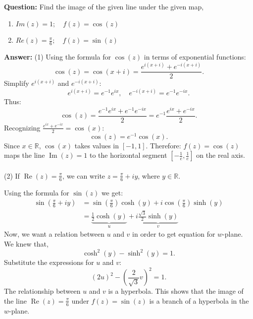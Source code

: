 \begin{example}
\textbf{Question:} Find the image of the given line under the given map, 
    \begin{enumerate}
        \item $Im(z)=1;\quad f(z)=\cos(z)$
        \item $Re(z)=\frac{\pi}{6};\quad f(z)=\sin(z)$
    \end{enumerate}
\textbf{Answer:} (1) Using the formula for \( \cos(z) \) in terms of exponential functions:
\[
\cos(z) = \cos(x + i) = \frac{e^{i(x+i)} + e^{-i(x+i)}}{2}.
\]
Simplify \( e^{i(x+i)} \) and \( e^{-i(x+i)} \):
\[
e^{i(x+i)} = e^{-1} e^{ix}, \quad e^{-i(x+i)} = e^{-1} e^{-ix}.
\]
Thus:
\[
\cos(z) = \frac{e^{-1} e^{ix} + e^{-1} e^{-ix}}{2} = e^{-1} \frac{e^{ix} + e^{-ix}}{2}.
\]
Recognizing \( \frac{e^{ix} + e^{-ix}}{2} = \cos(x) \):
\[
\cos(z) = e^{-1} \cos(x).
\]
Since \( x \in \mathbb{R} \), \( \cos(x) \) takes values in \([-1, 1]\). Therefore: $f(z) = \cos(z)$ maps the line $\operatorname{Im}(z) = 1$ to the horizontal segment $\left[-\frac{1}{e}, \frac{1}{e}\right]$ on the real axis.\\~\\
(2) If \( \operatorname{Re}(z) = \frac{\pi}{6} \), we can write \( z = \frac{\pi}{6} + iy \), where \( y \in \mathbb{R} \).

Using the formula for \( \sin(z) \) we get:
\begin{align*}
    \sin\left(\frac{\pi}{6}+iy\right) &= \sin\left(\frac{\pi}{6}\right)\cosh(y)+i\cos\left(\frac{\pi}{6}\right)\sinh(y)\\
                &= \underbrace{\frac{1}{2} \cosh(y)}_u + i \underbrace{\frac{\sqrt{3}}{2} \sinh(y)}_v    
\end{align*}
Now, we want a relation between $u$ and $v$ in order to get equation for $w$-plane. We knew that,
\[
\cosh^2(y) - \sinh^2(y) = 1.
\]
Substitute the expressions for \( u \) and \( v \):
\[
\left(2 u\right)^2 - \left(\frac{2}{\sqrt{3}} v\right)^2 = 1.
\]
The relationship between \( u \) and \( v \) is a hyperbola.
This shows that the image of the line \( \operatorname{Re}(z) = \frac{\pi}{6} \) under \( f(z) = \sin(z) \) is a branch of a hyperbola in the \( w \)-plane.
\end{example}


